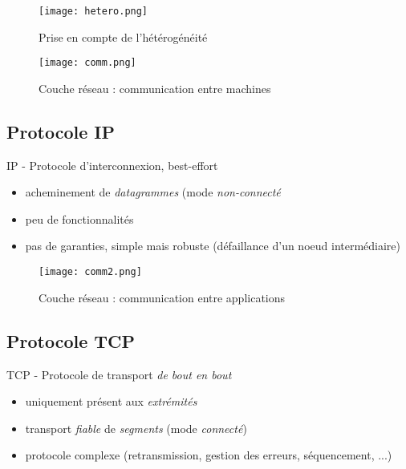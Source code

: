 \documentclass[journal, a4paper]{IEEEtran}
\begin{document}
	\begin{figure}[!hbt]
		\begin{center}
		\texttt{[image: hetero.png]}
		\caption{Prise en compte de l'hétérogénéité}
		\label{fig:hetero}
		\end{center}
	\end{figure}
	
	\begin{figure}[!hbt]
		\begin{center}
		\texttt{[image: comm.png]}
		\caption{Couche réseau : communication entre machines}
		\label{fig:comm}
		\end{center}
	\end{figure}
	
	\subsection{Protocole IP}
	IP - Protocole d'interconnexion, best-effort
	\begin{itemize}
		\item acheminement de \textit{datagrammes} (mode \textit{non-connecté}
		\item peu de fonctionnalités
		\item pas de garanties, simple mais robuste (défaillance d’un noeud
intermédiaire)
	\end{itemize}
	
	\begin{figure}[!hbt]
		\begin{center}
		\texttt{[image: comm2.png]}
		\caption{Couche réseau : communication entre applications}
		\label{fig:comm2}
		\end{center}
	\end{figure}
	
	\subsection{Protocole TCP}
	TCP - Protocole de transport \textit{de bout en bout}
	\begin{itemize}
		\item uniquement présent aux \textit{extrémités}
		\item transport \textit{fiable} de \textit{segments} (mode \textit{connecté})
		\item protocole complexe (retransmission, gestion des erreurs, séquencement, ...)
	\end{itemize}
	
\end{document}
